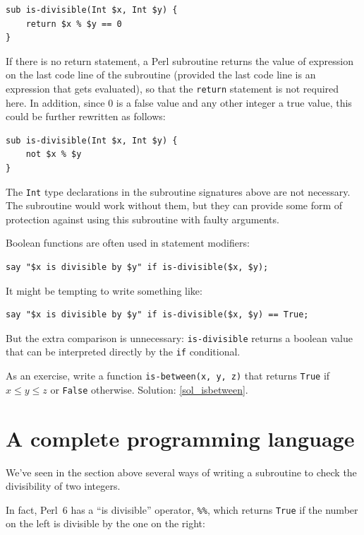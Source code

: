 \begin{verbatim}
sub is-divisible(Int $x, Int $y) {
    return $x % $y == 0
}
\end{verbatim}
%
If there is no return statement, a Perl subroutine returns the 
value of expression on the last code line of the subroutine 
(provided the last code line is an expression that gets evaluated), so that the 
{\tt return} statement is not required here. In addition, 
since 0 is a false value and any other integer a true value, 
this could be further rewritten as follows:
\begin{verbatim}
sub is-divisible(Int $x, Int $y) { 
    not $x % $y 
}
\end{verbatim}

The {\tt Int} type declarations in the subroutine signatures above 
are not necessary. The subroutine would work without them, but 
they can provide some form of protection against using this 
subroutine with faulty arguments.

Boolean functions are often used in statement modifiers:

\begin{verbatim}
say "$x is divisible by $y" if is-divisible($x, $y);
\end{verbatim}
%
It might be tempting to write something like:

\begin{verbatim}
say "$x is divisible by $y" if is-divisible($x, $y) == True;
\end{verbatim}
%
But the extra comparison is unnecessary: {\tt is-divisible} 
returns a boolean value that can be interpreted directly by
the {\tt if} conditional.

\label{isbetween}
As an exercise, write a function \verb"is-between(x, y, z)" that
returns {\tt True} if $x \le y \le z$ or {\tt False} otherwise.
Solution: \ref{sol_isbetween}.

\section{A complete programming language}

We've seen in the section above several ways of writing a 
subroutine to check the divisibility of two integers.

In fact, Perl~6 has a ``is divisible'' operator, \verb'%%', which returns {\tt True} if the number on the left is divisible by the one on the right:

